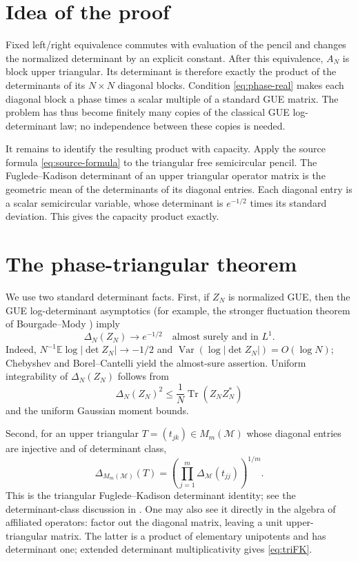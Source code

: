 \documentclass[11pt]{article}
\newcommand{\D}{\Delta}
\begin{document}
\section{Idea of the proof}

Fixed left/right equivalence commutes with evaluation of the pencil and changes
the normalized determinant by an explicit constant.  After this equivalence,
$A_N$ is block upper triangular.  Its determinant is therefore exactly the
product of the determinants of its $N\times N$ diagonal blocks.  Condition
\eqref{eq:phase-real} makes each diagonal block a phase times a scalar multiple
of a standard GUE matrix.  The problem has thus become finitely many copies of
the classical GUE log-determinant law; no independence between these copies is
needed.

It remains to identify the resulting product with capacity.  Apply the source
formula \eqref{eq:source-formula} to the triangular free semicircular pencil.
The Fuglede--Kadison determinant of an upper triangular operator matrix is the
geometric mean of the determinants of its diagonal entries.  Each diagonal
entry is a scalar semicircular variable, whose determinant is $e^{-1/2}$ times
its standard deviation.  This gives the capacity product exactly.

\section{The phase-triangular theorem}

We use two standard determinant facts.  First, if $Z_N$ is normalized GUE,
then the GUE log-determinant asymptotics (for example, the stronger fluctuation
theorem of Bourgade--Mody \cite{BM}) imply
\begin{equation}\label{eq:GUEdet}
  \D_N(Z_N)\longrightarrow e^{-1/2}
  \quad\text{almost surely and in }L^1.
\end{equation}
Indeed, $N^{-1}\mathbb E\log|\det Z_N|\to-1/2$ and
$\operatorname{Var}(\log|\det Z_N|)=O(\log N)$; Chebyshev and
Borel--Cantelli yield the almost-sure assertion.  Uniform integrability of
$\D_N(Z_N)$ follows from
\[
 \D_N(Z_N)^2\leq \frac1N\operatorname{Tr}(Z_NZ_N^*)
\]
and the uniform Gaussian moment bounds.

Second, for an upper triangular $T=(t_{jk})\in M_m(\mathcal M)$ whose
diagonal entries are injective and of determinant class,
\begin{equation}\label{eq:triFK}
 \D_{M_m(\mathcal M)}(T)
   =\left(\prod_{j=1}^m\D_{\mathcal M}(t_{jj})\right)^{1/m}.
\end{equation}
This is the triangular Fuglede--Kadison determinant identity; see the
determinant-class discussion in \cite{Luck}.  One may also see it directly in
the algebra of affiliated operators: factor out the diagonal matrix, leaving
a unit upper-triangular matrix.  The latter is a product of elementary
unipotents and has determinant one; extended determinant multiplicativity
gives \eqref{eq:triFK}.
\end{document}
